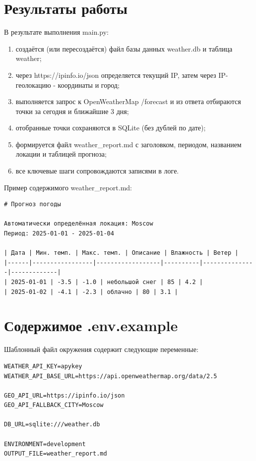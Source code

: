 \documentclass[oneside,a4paper,14pt]{extarticle}
\begin{document}
\section*{Результаты работы}
В результате выполнения main.py:
\begin{enumerate}
	\item создаётся (или пересоздаётся) файл базы данных weather.db и таблица weather;
	\item через https://ipinfo.io/json определяется текущий IP, затем через IP-геолокацию - координаты и город;
	\item выполняется запрос к OpenWeatherMap /forecast и из ответа отбираются точки за сегодня и ближайшие 3 дня;
	\item отобранные точки сохраняются в SQLite (без дублей по дате);
	\item формируется файл weather\_report.md с заголовком, периодом, названием локации и таблицей прогноза;
	\item все ключевые шаги сопровождаются записями в логе.
\end{enumerate}

Пример содержимого weather\_report.md:

\begin{small}
	\begin{verbatim}
# Прогноз погоды

Автоматически определённая локация: Moscow
Период: 2025-01-01 - 2025-01-04

| Дата | Мин. темп. | Макс. темп. | Описание | Влажность | Ветер |
|------|-----------------|------------------|----------|---------------|-------------|
| 2025-01-01 | -3.5 | -1.0 | небольшой снег | 85 | 4.2 |
| 2025-01-02 | -4.1 | -2.3 | облачно | 80 | 3.1 |
\end{verbatim}
\end{small}

\section*{Содержимое .env.example}
Шаблонный файл окружения содержит следующие переменные:

\begin{small}
	\begin{verbatim}
WEATHER_API_KEY=apykey
WEATHER_API_BASE_URL=https://api.openweathermap.org/data/2.5

GEO_API_URL=https://ipinfo.io/json
GEO_API_FALLBACK_CITY=Moscow

DB_URL=sqlite:///weather.db

ENVIRONMENT=development
OUTPUT_FILE=weather_report.md
\end{verbatim}
\end{small}
\end{document}
